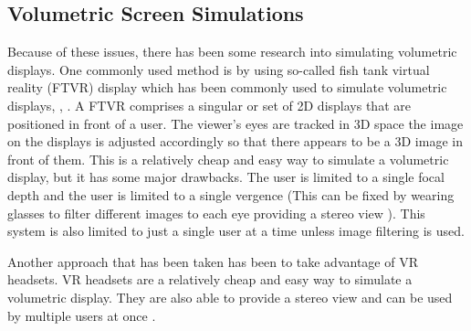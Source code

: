 \subsection{Volumetric Screen Simulations}
Because of these issues, there has been some research into simulating volumetric displays. One commonly used method is by using so-called fish tank virtual reality (FTVR) display \cite{10.1145/169059.169066} which has been commonly used to simulate volumetric displays, \cite{10.1145/3281505.3281540}, \cite{Zabarauskas2012}. A FTVR comprises a singular or set of 2D displays that are positioned in front of a user. The viewer's eyes are tracked in 3D space the image on the displays is adjusted accordingly so that there appears to be a 3D image in front of them. This is a relatively cheap and easy way to simulate a volumetric display, but it has some major drawbacks. The user is limited to a single focal depth and the user is limited to a single vergence (This can be fixed by wearing glasses to filter different images to each eye providing a stereo view \cite{5701756}). This system is also limited to just a single user at a time unless image filtering is used. 

Another approach that has been taken has been to take advantage of VR headsets. VR headsets are a relatively cheap and easy way to simulate a volumetric display. They are also able to provide a stereo view and can be used by multiple users at once \cite{10.1145/3290605.3300763}.
